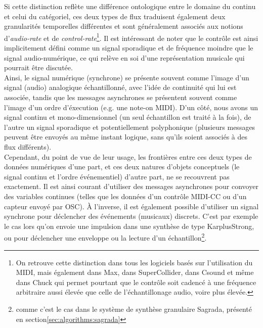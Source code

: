 \noindent Si cette distinction reflète une différence ontologique entre le domaine du continu et celui du catégoriel, ces deux types de flux traduisent également deux granularités temporelles différentes et sont généralement associés aux notions d'\textit{audio-rate} et de \textit{control-rate}\footnote{On retrouve cette distinction dans tous les logiciels basés sur l'utilisation du \gls{MIDI}, mais également dans Max, dans SuperCollider, dans Csound et même dans Chuck qui permet pourtant que le contrôle soit cadencé à une fréquence arbitraire aussi élevée que celle de l'échantillonage audio, voire plus élevée.}. Il est intéressant de noter que le contrôle est ainsi implicitement défini comme un signal sporadique et de fréquence moindre que le signal audio-numérique, ce qui relève en soi d'une représentation musicale qui pourrait être discutée.\\
\indent Ainsi, le signal numérique (synchrone) se présente souvent comme l'image d'un signal (audio) analogique échantillonné, avec l'idée de continuité qui lui est associée, tandis que les messages asynchrones se présentent souvent comme l'image d'un ordre d'éxecution (e.g. une note-on \gls{MIDI}). D'un côté, nous avons un signal continu et mono-dimensionnel (un seul échantillon est traité à la fois), de l'autre un signal sporadique et potentiellement polyphonique (plusieurs messages peuvent être envoyés au même instant logique, sans qu'ils soient associés à des flux différents).\\
\indent Cependant, du point de vue de leur usage, les frontières entre ces deux types de données numériques d'une part, et ces deux natures d'objets conceptuels (le signal continu et l'ordre événementiel) d'autre part, ne se recouvrent pas exactement. Il est ainsi courant d'utiliser des messages asynchrones pour convoyer des variables continues (telles que les données d'un contrôle MIDI-CC ou d'un capteur envoyé par \gls{OSC}). À l'inverse, il est également possible d'utiliser un signal synchrone pour déclencher des événements (musicaux) discrets. C'est par exemple le cas lors qu'on envoie une impulsion dans une synthèse de type \gls{KarplusStrong}, ou pour déclencher une enveloppe ou la lecture d'un échantillon\footnote{comme c'est le cas dans le système de synthèse granulaire Sagrada, présenté en section\ref{sec:algorithms:sagrada}}.

